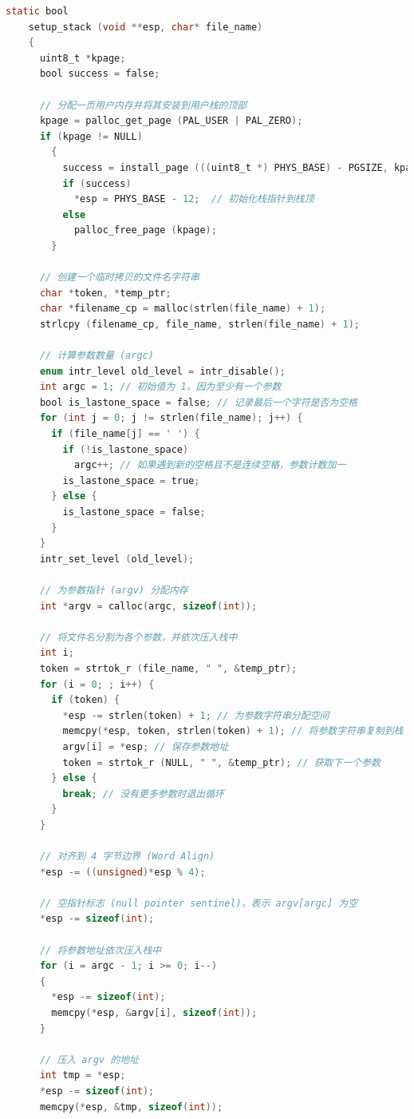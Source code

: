 \documentclass[14pt,a4paper,UTF8,twoside]{article}
\begin{document}
\begin{lstlisting}[language=C, title= setup\_stack]
    static bool
    setup_stack (void **esp, char* file_name)
    {
      uint8_t *kpage;
      bool success = false;
    
      // 分配一页用户内存并将其安装到用户栈的顶部
      kpage = palloc_get_page (PAL_USER | PAL_ZERO);
      if (kpage != NULL) 
        {
          success = install_page (((uint8_t *) PHYS_BASE) - PGSIZE, kpage, true);
          if (success)
            *esp = PHYS_BASE - 12;  // 初始化栈指针到栈顶
          else
            palloc_free_page (kpage);
        }
    
      // 创建一个临时拷贝的文件名字符串
      char *token, *temp_ptr;
      char *filename_cp = malloc(strlen(file_name) + 1);
      strlcpy (filename_cp, file_name, strlen(file_name) + 1);
    
      // 计算参数数量 (argc)
      enum intr_level old_level = intr_disable();
      int argc = 1; // 初始值为 1，因为至少有一个参数
      bool is_lastone_space = false; // 记录最后一个字符是否为空格
      for (int j = 0; j != strlen(file_name); j++) {
        if (file_name[j] == ' ') {
          if (!is_lastone_space)
            argc++; // 如果遇到新的空格且不是连续空格，参数计数加一
          is_lastone_space = true;
        } else {
          is_lastone_space = false;
        }
      }
      intr_set_level (old_level);
    
      // 为参数指针 (argv) 分配内存
      int *argv = calloc(argc, sizeof(int));
    
      // 将文件名分割为各个参数，并依次压入栈中
      int i;
      token = strtok_r (file_name, " ", &temp_ptr);
      for (i = 0; ; i++) {
        if (token) {
          *esp -= strlen(token) + 1; // 为参数字符串分配空间
          memcpy(*esp, token, strlen(token) + 1); // 将参数字符串复制到栈
          argv[i] = *esp; // 保存参数地址
          token = strtok_r (NULL, " ", &temp_ptr); // 获取下一个参数
        } else {
          break; // 没有更多参数时退出循环
        }
      }
    
      // 对齐到 4 字节边界 (Word Align)
      *esp -= ((unsigned)*esp % 4);
    
      // 空指针标志 (null pointer sentinel)，表示 argv[argc] 为空
      *esp -= sizeof(int);
    
      // 将参数地址依次压入栈中
      for (i = argc - 1; i >= 0; i--)
      {
        *esp -= sizeof(int);
        memcpy(*esp, &argv[i], sizeof(int));
      }
    
      // 压入 argv 的地址
      int tmp = *esp;
      *esp -= sizeof(int);
      memcpy(*esp, &tmp, sizeof(int));
    

\end{lstlisting}
\end{document}
